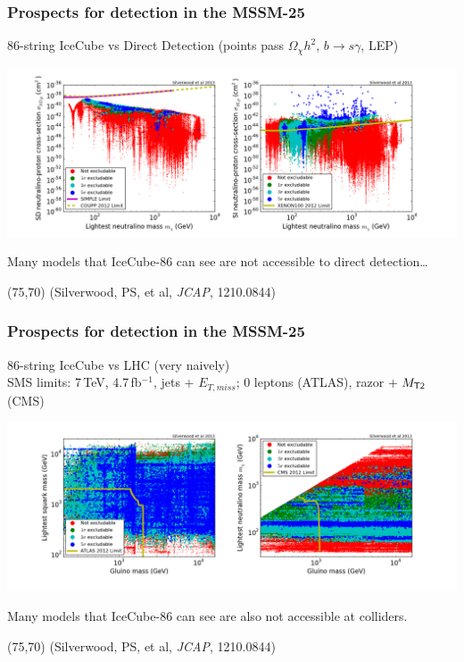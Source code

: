 \documentclass[xcolor=dvipsnames]{beamer}
\begin{document}
\begin{frame}
\frametitle{Prospects for detection in the MSSM-25}
86-string IceCube vs Direct Detection {\scriptsize(points pass $\Omega_\chi h^2$, $b\rightarrow s\gamma$, LEP)}
\vspace{3mm}

\includegraphics[width=1.1\textwidth, trim = 50 0 0 0, clip=true]{MSSM25_DD}

\vspace{3mm}
Many models that IceCube-86 can see are not accessible to direct detection\ldots

\begin{textblock}{80}(75,70)
  {\tiny(Silverwood, PS, et al, \textit{JCAP}, 1210.0844)}
\end{textblock}

\end{frame}

\begin{frame}
\frametitle{Prospects for detection in the MSSM-25}
86-string IceCube vs LHC (very naively)\\
{\scriptsize SMS limits: 7\,TeV, 4.7\,fb$^{-1}$, jets + $E_{T,miss}$; 0 leptons (ATLAS), razor + $M_{\sf T2}$ (CMS)}

\includegraphics[width=1.1\textwidth, trim = 50 0 0 0, clip=true]{MSSM25_LHC}

Many models that IceCube-86 can see are also not accessible at colliders.

\begin{textblock}{80}(75,70)
  {\tiny(Silverwood, PS, et al, \textit{JCAP}, 1210.0844)}
\end{textblock}

\end{frame}
\end{document}
